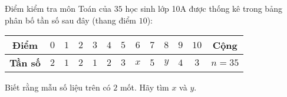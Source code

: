 \begin{bt}%
	Điểm kiểm tra môn Toán của $35$ học sinh lớp 10A được thống kê trong bảng phân bố tần số sau đây (thang điểm $10$):
	\begin{center}
		\begin{tabular}{|c|c|c|c|c|c|c|c|c|c|c|c|c|}
			\hline 
			\bf Điểm &$0$ &$1$&$2$&$3$&$4$&$5$&$6$&$7$&$8$&$9$&$10$& Cộng\\ 
			\hline
			\bf Tần số &$2$ &$1$&$2$&$1$&$2$&$3$&$x$&$5$&$y$&$4$&$3$& $n=35$\\
			\hline
		\end{tabular}
	\end{center}
	Biết rằng mẫu số liệu trên có $2$ mốt. Hãy tìm $x$ và $y$.
\end{bt}

